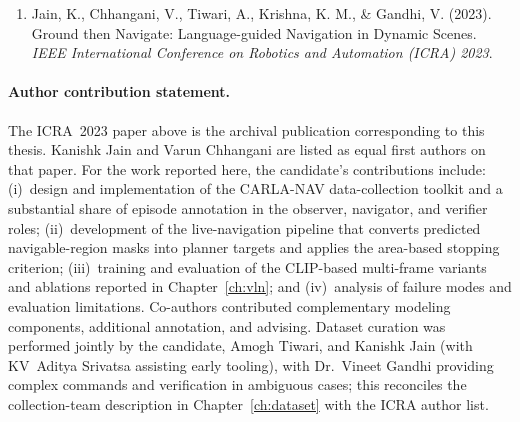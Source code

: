 \begin{enumerate}
    \item Jain, K., Chhangani, V., Tiwari, A., Krishna, K. M., \& Gandhi, V. (2023). Ground then Navigate: Language-guided Navigation in Dynamic Scenes. \textit{IEEE International Conference on Robotics and Automation (ICRA) 2023}.
\end{enumerate}

\paragraph{Author contribution statement.}
The ICRA~2023 paper above is the archival publication corresponding to this thesis. Kanishk Jain and Varun Chhangani are listed as equal first authors on that paper. For the work reported here, the candidate's contributions include: (i)~design and implementation of the CARLA-NAV data-collection toolkit and a substantial share of episode annotation in the observer, navigator, and verifier roles; (ii)~development of the live-navigation pipeline that converts predicted navigable-region masks into planner targets and applies the area-based stopping criterion; (iii)~training and evaluation of the CLIP-based multi-frame variants and ablations reported in Chapter~\ref{ch:vln}; and (iv)~analysis of failure modes and evaluation limitations. Co-authors contributed complementary modeling components, additional annotation, and advising. Dataset curation was performed jointly by the candidate, Amogh Tiwari, and Kanishk Jain (with KV~Aditya Srivatsa assisting early tooling), with Dr.~Vineet Gandhi providing complex commands and verification in ambiguous cases; this reconciles the collection-team description in Chapter~\ref{ch:dataset} with the ICRA author list.
